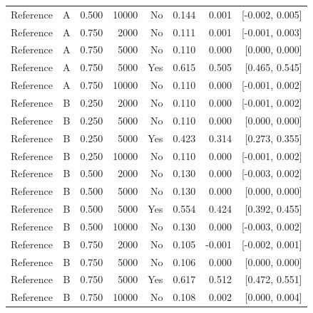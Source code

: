 \begin{longtable}{lrrrrrrr}
Reference & A & 0.500 & 10000 & No & 0.144 & 0.001 & [-0.002, 0.005] \\
Reference & A & 0.750 &  2000 & No & 0.111 & 0.001 & [-0.001, 0.003] \\
Reference & A & 0.750 &  5000 & No & 0.110 & 0.000 & [0.000, 0.000] \\
Reference & A & 0.750 &  5000 & Yes & 0.615 & 0.505 & [0.465, 0.545] \\
Reference & A & 0.750 & 10000 & No & 0.110 & 0.000 & [-0.001, 0.002] \\
Reference & B & 0.250 &  2000 & No & 0.110 & 0.000 & [-0.001, 0.002] \\
Reference & B & 0.250 &  5000 & No & 0.110 & 0.000 & [0.000, 0.000] \\
Reference & B & 0.250 &  5000 & Yes & 0.423 & 0.314 & [0.273, 0.355] \\
Reference & B & 0.250 & 10000 & No & 0.110 & 0.000 & [-0.001, 0.002] \\
Reference & B & 0.500 &  2000 & No & 0.130 & 0.000 & [-0.003, 0.002] \\
Reference & B & 0.500 &  5000 & No & 0.130 & 0.000 & [0.000, 0.000] \\
Reference & B & 0.500 &  5000 & Yes & 0.554 & 0.424 & [0.392, 0.455] \\
Reference & B & 0.500 & 10000 & No & 0.130 & 0.000 & [-0.003, 0.002] \\
Reference & B & 0.750 &  2000 & No & 0.105 & -0.001 & [-0.002, 0.001] \\
Reference & B & 0.750 &  5000 & No & 0.106 & 0.000 & [0.000, 0.000] \\
Reference & B & 0.750 &  5000 & Yes & 0.617 & 0.512 & [0.472, 0.551] \\
Reference & B & 0.750 & 10000 & No & 0.108 & 0.002 & [0.000, 0.004] \\
\bottomrule
\end{longtable}

